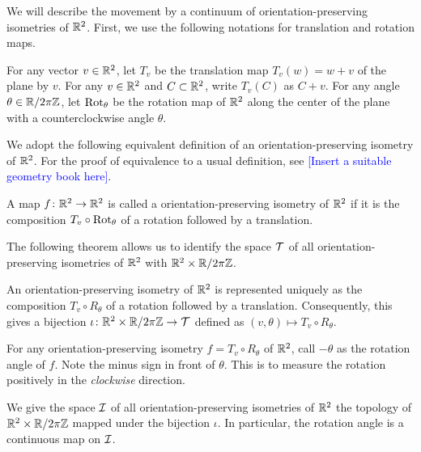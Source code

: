 We will describe the movement by a continuum of orientation-preserving isometries of $\mathbb{R}^2$.
First, we use the following notations for translation and rotation maps.
\begin{definition}
For any vector $v \in \mathbb{R}^2$, let $T_v$ be the translation map $T_v(w) = w + v$ of the plane by $v$.
For any $v \in \mathbb{R}^2$ and $C \subset \mathbb{R}^2$, write $T_v(C)$ as $C + v$.
For any angle $\theta \in \mathbb{R} / 2 \pi \mathbb{Z}$, let $\operatorname{Rot}_\theta$ be the rotation map of $\mathbb{R}^2$ along the center of the plane with a counterclockwise angle $\theta$.
\end{definition}
We adopt the following equivalent definition of an orientation-preserving isometry of $\mathbb{R}^2$. For the proof of equivalence to a usual definition, see \textcolor{blue}{[Insert a suitable geometry book here]}.
\begin{definition}
A map $f \colon \mathbb{R}^2 \rightarrow \mathbb{R}^2$ is called a orientation-preserving isometry of $\mathbb{R}^2$ if
it is the composition $T_v \circ \operatorname{Rot}_\theta$ of a rotation followed by a translation.
\end{definition}
The following theorem allows us to identify the space $\mathcal{T}$ of all orientation-preserving isometries of $\mathbb{R}^2$ with $\mathbb{R}^2 \times \mathbb{R} / 2 \pi \mathbb{Z}$.
\begin{theorem}
An orientation-preserving isometry of $\mathbb{R}^2$ is represented uniquely as the composition $T_v \circ R_\theta$ of a rotation followed by a translation.
Consequently, this gives a bijection $\iota \colon \mathbb{R}^2 \times \mathbb{R} / 2 \pi \mathbb{Z} \rightarrow \mathcal{T}$ defined as $(v, \theta) \mapsto T_v \circ R_\theta$.
\end{theorem}
\begin{definition}
For any orientation-preserving isometry $f = T_v \circ R_\theta$ of $\mathbb{R}^2$, call $-\theta$ as the rotation angle of $f$.
Note the minus sign in front of $\theta$. This is to measure the rotation positively in the \emph{clockwise} direction.

We give the space $\mathcal{I}$ of all orientation-preserving isometries of $\mathbb{R}^2$ the topology of $\mathbb{R}^2 \times \mathbb{R} / 2 \pi \mathbb{Z}$ mapped under the bijection $\iota$.
In particular, the rotation angle is a continuous map on $\mathcal{I}$.
\end{definition}

